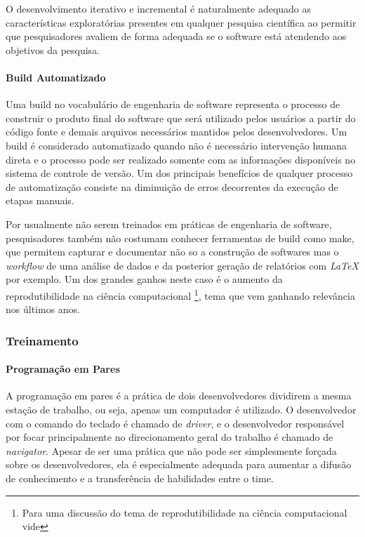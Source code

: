 \documentclass[
	article,			%
	11pt,				%
	oneside,			%
	a4paper,			%
	english,			%
	brazil,				%
	sumario=tradicional
	]{abntex2}
\begin{document}
O desenvolvimento iterativo e incremental é naturalmente adequado as características exploratórias presentes em qualquer pesquisa científica ao permitir que pesquisadores avaliem de forma adequada se o software está atendendo aos objetivos da pesquisa.

\paragraph*{Build Automatizado}
Uma build no vocabulário de engenharia de software representa o processo de construir o produto final do software que será utilizado pelos usuários a partir do código fonte e demais arquivos necessários mantidos pelos desenvolvedores. Um build é considerado automatizado quando não é necessário intervenção humana direta e o processo pode ser realizado somente com as informações disponíveis no sistema de controle de versão. Um dos principais benefícios de qualquer processo de automatização consiste na diminuição de erros decorrentes da execução de etapas manuais.

Por usualmente não serem treinados em práticas de engenharia de software, pesquisadores também não costumam conhecer ferramentas de build como make, que permitem capturar e documentar não so a construção de softwares mas o \emph{workflow} de uma análise de dados e da posterior geração de relatórios com \emph{LaTeX} por exemplo. Um dos grandes ganhos neste caso é o aumento da reprodutibilidade na ciência computacional \footnote{Para uma discussão do tema de reprodutibilidade na ciência computacional vide }, tema que vem ganhando relevância nos últimos anos.

\subsubsection*{Treinamento}

\paragraph*{Programação em Pares}
A programação em pares é a prática de dois desenvolvedores dividirem a mesma estação de trabalho, ou seja, apenas um computador é utilizado. O desenvolvedor com o comando do teclado é chamado de \emph{driver}, e o desenvolvedor responsável por focar principalmente no direcionamento geral do trabalho é chamado de \emph{navigator}. Apesar de ser uma prática que não pode ser simplesmente forçada sobre os desenvolvedores, ela é especialmente adequada para aumentar a difusão de conhecimento e a transferência de habilidades entre o time.
\end{document}

